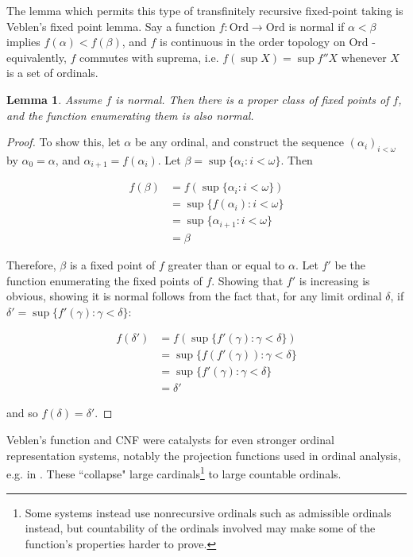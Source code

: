 \documentclass{article}
\theoremstyle{definition}
\theoremstyle{plain}
\theoremstyle{plain}
\theoremstyle{plain}
\theoremstyle{plain}
\theoremstyle{remark}
\theoremstyle{remark}
\theoremstyle{remark}
\theoremstyle{plain}
\newtheorem{lemma}[definition]{Lemma}
\theoremstyle{plain}
\begin{document}
The lemma which permits this type of transfinitely recursive fixed-point taking is Veblen's fixed point lemma. Say a function $f: \mathrm{Ord} \to \mathrm{Ord}$ is normal if $\alpha < \beta$ implies $f(\alpha) < f(\beta)$, and $f$ is continuous in the order topology on $\mathrm{Ord}$ - equivalently, $f$ commutes with suprema, i.e. $f(\sup X) = \sup f''X$ whenever $X$ is a set of ordinals.

\begin{lemma}
Assume $f$ is normal. Then there is a proper class of fixed points of $f$, and the function enumerating them is also normal.
\end{lemma}

\begin{proof}
To show this, let $\alpha$ be any ordinal, and construct the sequence $(\alpha_i)_{i < \omega}$ by $\alpha_0 = \alpha$, and $\alpha_{i + 1} = f(\alpha_i)$. Let $\beta = \sup\{\alpha_i: i < \omega\}$. Then

\begin{equation}
\begin{split}
f(\beta) & = f(\sup\{\alpha_i: i < \omega\}) \\ & = \sup\{f(\alpha_i): i < \omega\} \\ & = \sup\{\alpha_{i+1}: i < \omega\} \\ & = \beta
\end{split}
\end{equation}

Therefore, $\beta$ is a fixed point of $f$ greater than or equal to $\alpha$. Let $f'$ be the function enumerating the fixed points of $f$. Showing that $f'$ is increasing is obvious, showing it is normal follows from the fact that, for any limit ordinal $\delta$, if $\delta' = \sup\{f'(\gamma): \gamma < \delta\}$:

\begin{equation}
\begin{split}
f(\delta') & = f(\sup\{f'(\gamma): \gamma < \delta\}) \\ & = \sup\{f(f'(\gamma)): \gamma < \delta\} \\ & = \sup\{f'(\gamma): \gamma < \delta\} \\ & = \delta'
\end{split}
\end{equation}

and so $f(\delta) = \delta'$.
\end{proof}

Veblen's function and CNF were catalysts for even stronger ordinal representation systems, notably the projection functions used in ordinal analysis, e.g. in \cite{buchholz3}. These ``collapse" large cardinals\footnote{Some systems instead use nonrecursive ordinals such as admissible ordinals instead, but countability of the ordinals involved may make some of the function's properties harder to prove.} to large countable ordinals.
\end{document}
